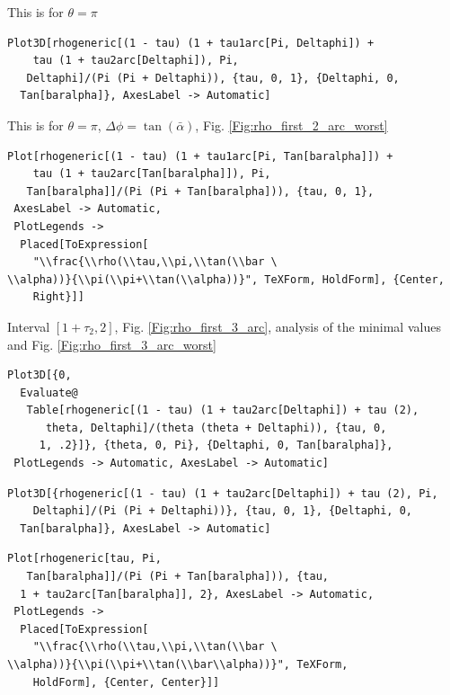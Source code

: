 \documentclass[reqno]{amsart}
\theoremstyle{definition} \newtheorem{definition}{Definition}[section]
\theoremstyle{definition} \newtheorem{remark}[definition]{Remark}
\theoremstyle{plain} \newtheorem{lemma}[definition]{Lemma}
\theoremstyle{plain} \newtheorem{proposition}[definition]{Proposition}
\theoremstyle{plain} \newtheorem{theorem}[definition]{Theorem}
\theoremstyle{plain} \newtheorem{corollary}[definition]{Corollary}
\theoremstyle{definition} \newtheorem{example}[definition]{Example}
\theoremstyle{plain} \newtheorem{claim}[clai]{Claim}
\theoremstyle{definition} \newtheorem{assumption}[definition]{Assumption}
\theoremstyle{definition} \newtheorem{observation}[definition]{Observation}
\newcommand{\1}{\mathbbm 1}
\newcommand{\smed}{\medskip}
\numberwithin{equation}{section} %
\theoremstyle{plain} \newtheorem*{theorem*}{Theorem}
\theoremstyle{plain} \newtheorem{mthm}[maintheorem]{Main Theorem}
\theoremstyle{plain} \newtheorem*{mthm*}{Main Theorem}
\theoremstyle{plain} \newtheorem*{conjecture*}{Conjecture}
\theoremstyle{plain} \newtheorem{conjecture}[definition]{Conjecture}
\theoremstyle{plain} \newtheorem*{problem*}{Problem}
\begin{document}
\smed
This is for $\theta = \pi$
\smed
\begin{verbatim}
Plot3D[rhogeneric[(1 - tau) (1 + tau1arc[Pi, Deltaphi]) + 
    tau (1 + tau2arc[Deltaphi]), Pi, 
   Deltaphi]/(Pi (Pi + Deltaphi)), {tau, 0, 1}, {Deltaphi, 0, 
  Tan[baralpha]}, AxesLabel -> Automatic]
\end{verbatim}
\smed
This is for $\theta = \pi$, $\Delta \phi = \tan(\bar \alpha)$, Fig. \ref{Fig:rho_first_2_arc_worst}
\smed
\begin{verbatim}
Plot[rhogeneric[(1 - tau) (1 + tau1arc[Pi, Tan[baralpha]]) + 
    tau (1 + tau2arc[Tan[baralpha]]), Pi, 
   Tan[baralpha]]/(Pi (Pi + Tan[baralpha])), {tau, 0, 1}, 
 AxesLabel -> Automatic, 
 PlotLegends -> 
  Placed[ToExpression[
    "\\frac{\\rho(\\tau,\\pi,\\tan(\\bar \
\\alpha))}{\\pi(\\pi+\\tan(\\alpha))}", TeXForm, HoldForm], {Center, 
    Right}]]
\end{verbatim}
\smed
Interval $[1+\tau_2,2]$, Fig. \ref{Fig:rho_first_3_arc}, analysis of the minimal values and Fig. \ref{Fig:rho_first_3_arc_worst}
\smed
\begin{verbatim}
Plot3D[{0, 
  Evaluate@
   Table[rhogeneric[(1 - tau) (1 + tau2arc[Deltaphi]) + tau (2), 
      theta, Deltaphi]/(theta (theta + Deltaphi)), {tau, 0, 
     1, .2}]}, {theta, 0, Pi}, {Deltaphi, 0, Tan[baralpha]}, 
 PlotLegends -> Automatic, AxesLabel -> Automatic]
\end{verbatim}
\begin{verbatim}
Plot3D[{rhogeneric[(1 - tau) (1 + tau2arc[Deltaphi]) + tau (2), Pi, 
    Deltaphi]/(Pi (Pi + Deltaphi))}, {tau, 0, 1}, {Deltaphi, 0, 
  Tan[baralpha]}, AxesLabel -> Automatic]
\end{verbatim}
\begin{verbatim}
Plot[rhogeneric[tau, Pi, 
   Tan[baralpha]]/(Pi (Pi + Tan[baralpha])), {tau, 
  1 + tau2arc[Tan[baralpha]], 2}, AxesLabel -> Automatic, 
 PlotLegends -> 
  Placed[ToExpression[
    "\\frac{\\rho(\\tau,\\pi,\\tan(\\bar \
\\alpha))}{\\pi(\\pi+\\tan(\\bar\\alpha))}", TeXForm, 
    HoldForm], {Center, Center}]]
\end{verbatim}
\end{document}
